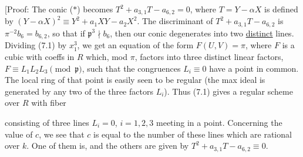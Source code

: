 [Proof: The conic ($*$) becomes $T^2+a_{3,1}T-a_{6,2}=0$, where $T=Y-\alpha X$ is defined by $(Y-\alpha X)^2\equiv Y^2+a_1XY-a_2X^2$. The discriminant of $T^2+a_{3,1}T-a_{6,2}$ is $\pi^{-2} b_6=b_{6,2}$, so that if $\mathfrak p^3\nmid b_6$, then our conic degenerates into two \uline{distinct} lines. Dividing (7.1) by $x_1^3$, we get an equation of the form $F(U,V)=\pi$, where $F$ is a cubic with coeffs in $R$ which, mod $\pi$, factors into three distinct linear factors, $F\equiv L_1L_2L_3\pmod{\mathfrak p}$, such that the congruences $L_i\equiv0$ have a point in common. The local ring of that point is easily seen to be regular (the max ideal is generated by any two of the three factors $L_i$). Thus (7.1) gives a regular scheme over $R$ with fiber
\parbox[c]{1.48cm}{\setlength{\topsep}{0pt}}
consisting of three lines $L_i=0$, $i=1,2,3$ meeting in a point. Concerning the value of $c$, we see that $c$ is equal to the number of these lines which are rational over $k$. One of them is, and the others are given by $T^2+a_{3,1}T-a_{6,2}\equiv0$.
\normalmarginpar
\endgroup
